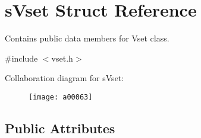 \section{s\-Vset Struct Reference}
\label{a00006}


Contains public data members for Vset class.  




{\ttfamily \#include $<$vset.\-h$>$}



Collaboration diagram for s\-Vset\-:\nopagebreak
\begin{figure}[H]
\begin{center}
\leavevmode
\texttt{[image: a00063]}
\end{center}
\end{figure}
\subsection*{Public Attributes}
